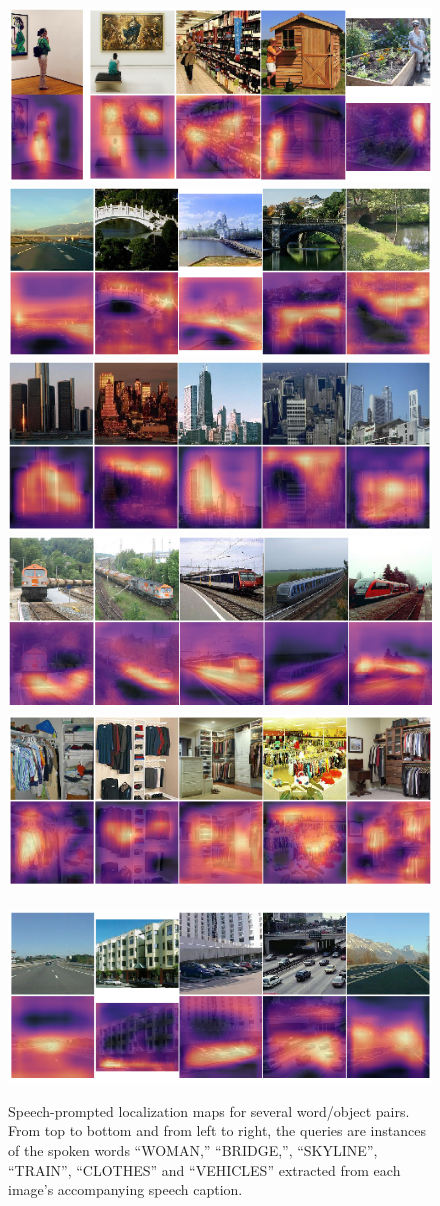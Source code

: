 \begin{figure}
	\includegraphics[width=.48\linewidth]{figures/images_paper/localization_WOMAN_cropped.png}
    \includegraphics[width=.48\linewidth]{figures/images_paper/localization_BRIDGE_cropped.png}
    \includegraphics[width=.48\linewidth]{figures/images_paper/localization_SKYLINE_cropped.png}
    \includegraphics[width=.48\linewidth]{figures/images_paper/localization_TRAIN_cropped.png}
    \includegraphics[width=.48\linewidth]{figures/images_paper/localization_CLOTHES_cropped.png}
    ~~~~~~~~\includegraphics[width=.48\linewidth]{figures/images_paper/localization_VEHICLES_cropped.png}
	\caption[Speech-prompted localization maps]{Speech-prompted localization maps for several word/object pairs. From top to bottom and from left to right, the queries are instances of the spoken words ``WOMAN,'' ``BRIDGE,'', ``SKYLINE'', ``TRAIN'', ``CLOTHES'' and ``VEHICLES'' extracted from each image's accompanying speech caption.}
	\label{fig:localization_maps}
\end{figure}

